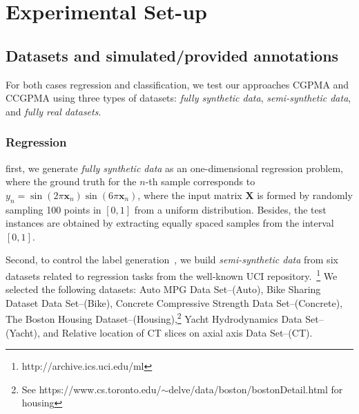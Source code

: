\documentclass[journal]{IEEEtran}
\providecommand{\ve}[1]{{\bm{#1}}}%
\providecommand{\mat}[1]{{\bm{#1}}} %
\providecommand{\ve}[1]{{\mathbf{#1}}}
\providecommand{\mat}[1]{{\mathbf{#1}}}
\begin{document}








\section{Experimental Set-up}\label{sec:expsetup}
\subsection{Datasets and simulated/provided annotations}\label{sec:datasets}
For both cases regression and classification, we test our approaches CGPMA and CCGPMA using three types of datasets:  \textit{fully synthetic data}, \textit{semi-synthetic data}, and \textit{fully real datasets}. 

\subsubsection{Regression}\label{sec:datasetsReg}
first, we generate \textit{fully synthetic data} as an one-dimensional regression problem, where the ground truth for the $n$-th sample corresponds to $y_n = \sin(2\pi \ve{x}_n)\sin(6\pi \ve{x}_n)$, where the input matrix $\mat{X}$ is formed by randomly sampling 100 points in $[0,1]$ from a uniform distribution. Besides, the test instances are obtained by extracting equally spaced samples from the interval $[0,1]$.

Second, to control the label generation~\cite{ruiz2019learning}, we build \textit{semi-synthetic data} from six datasets related to regression tasks from the well-known {UCI repository}.~\footnote{http://archive.ics.uci.edu/ml}
We selected the following datasets: {Auto MPG Data Set}--(Auto), {Bike Sharing Dataset Data Set}--(Bike), {Concrete Compressive Strength Data Set}--(Concrete), {The Boston Housing Dataset}--(Housing),\footnote{See https://www.cs.toronto.edu/$\sim${d}elve/data/boston/bostonDetail.html for housing} {Yacht Hydrodynamics Data Set}--(Yacht), and {Relative location of CT slices on axial axis Data Set}--(CT).  
\end{document}
